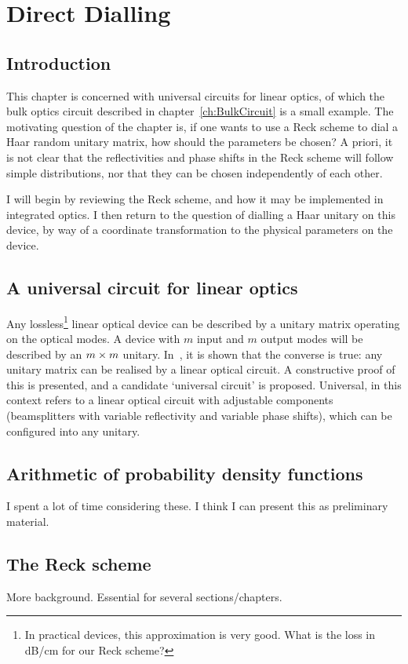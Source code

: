 \chapter{Direct Dialling}
\label{ch:DirectDialling}
\section{Introduction}
This chapter is concerned with universal circuits for linear optics, of which
the bulk optics circuit described in chapter~\ref{ch:BulkCircuit} is a small
example.
The motivating question of the chapter is, if one wants to use a Reck
scheme\cite{reck94} to dial a Haar random unitary matrix, how should the
parameters be chosen? A priori, it is not clear that the reflectivities and
phase shifts in the Reck scheme will follow simple distributions, nor that they
can be chosen independently of each other.

I will begin by reviewing the Reck scheme, and how it may be implemented in
integrated optics. I then return to the question of dialling a Haar unitary on
this device, by way of a coordinate transformation to the physical parameters on
the device.

\section{A universal circuit for linear optics}
Any lossless\footnote{In practical devices, this approximation is very good.
What is the loss in dB/cm for our Reck scheme?} linear optical device can be
described by a unitary matrix operating on the optical modes. A device with
\(m\) input and \(m\) output modes will be described by an \(m \times m\) unitary.
In~\cite{reck94}, it is shown that the converse is true: any unitary matrix can
be realised by a linear optical circuit. A constructive proof of this is
presented, and a candidate `universal circuit' is proposed. Universal, in this
context refers to a linear optical circuit with adjustable components
(beamsplitters with variable reflectivity and variable phase shifts), which can
be configured into any unitary.

\section{Arithmetic of probability density functions}
I spent a lot of time considering these. I think I can present this as
preliminary material.

\section{The Reck scheme}
More background. Essential for several sections/chapters.

